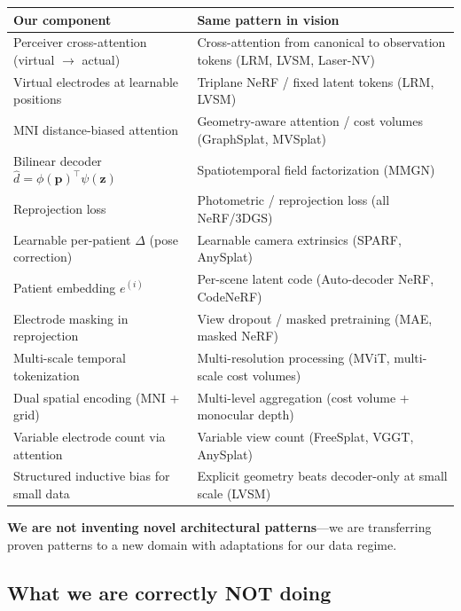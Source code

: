 \documentclass[11pt,letterpaper]{article}
\newcommand{\bfp}{\mathbf{p}}
\newcommand{\bfz}{\mathbf{z}}
\begin{document}
\begin{table}[h]\centering\small
\begin{tabular}{@{}p{}p{}@{}}
\toprule
\textbf{Our component} & \textbf{Same pattern in vision} \\
\midrule
Perceiver cross-attention (virtual $\to$ actual) & Cross-attention from canonical to observation tokens (LRM, LVSM, Laser-NV) \\
Virtual electrodes at learnable positions & Triplane NeRF / fixed latent tokens (LRM, LVSM) \\
MNI distance-biased attention & Geometry-aware attention / cost volumes (GraphSplat, MVSplat) \\
Bilinear decoder $\hat{d} = \phi(\bfp)^\top\psi(\bfz)$ & Spatiotemporal field factorization (MMGN) \\
Reprojection loss & Photometric / reprojection loss (all NeRF/3DGS) \\
Learnable per-patient $\Delta$ (pose correction) & Learnable camera extrinsics (SPARF, AnySplat) \\
Patient embedding $e^{(i)}$ & Per-scene latent code (Auto-decoder NeRF, CodeNeRF) \\
Electrode masking in reprojection & View dropout / masked pretraining (MAE, masked NeRF) \\
Multi-scale temporal tokenization & Multi-resolution processing (MViT, multi-scale cost volumes) \\
Dual spatial encoding (MNI + grid) & Multi-level aggregation (cost volume + monocular depth) \\
Variable electrode count via attention & Variable view count (FreeSplat, VGGT, AnySplat) \\
Structured inductive bias for small data & Explicit geometry beats decoder-only at small scale (LVSM) \\
\bottomrule
\end{tabular}
\end{table}

\noindent\textbf{We are not inventing novel architectural patterns}---we are transferring proven patterns to a new domain with adaptations for our data regime.

\subsection{What we are correctly NOT doing}
\end{document}
